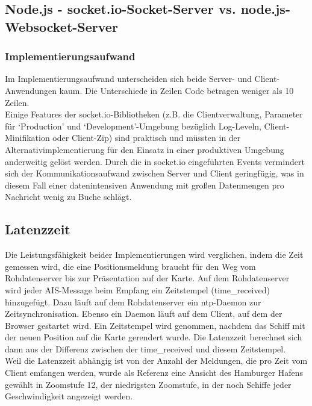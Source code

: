 \subsection{Node.js - socket.io-Socket-Server vs. node.js-Websocket-Server}\label{socket.io- vs html5-Server}
\subsubsection{Implementierungsaufwand}
Im Implementierungsaufwand unterscheiden sich beide Server- und Client-Anwendungen kaum. Die Unterschiede in Zeilen Code betragen weniger als 10 Zeilen.\\
Einige Features der socket.io-Bibliotheken (z.B. die Clientverwaltung, Parameter für ‘Production’ und ‘Development’-Umgebung bezüglich Log-Leveln, Client-Minifikation oder Client-Zip) sind praktisch und müssten in der Alternativimplementierung für den Einsatz in einer produktiven Umgebung anderweitig gelöst werden. Durch die in socket.io eingeführten Events vermindert sich der Kommunikationsaufwand zwischen Server und Client geringfügig, was in diesem Fall einer datenintensiven Anwendung mit großen Datenmengen pro Nachricht wenig zu Buche schlägt.
\subsection{Latenzzeit}
Die Leistungsfähigkeit beider Implementierungen wird verglichen, indem die Zeit gemessen wird, die eine Positionsmeldung braucht für den Weg vom Rohdatenserver bis zur Präsentation auf der Karte.
Auf dem Rohdatenserver wird jeder AIS-Message beim Empfang ein Zeitstempel (time\_received) hinzugefügt. Dazu läuft auf dem Rohdatenserver ein ntp-Daemon zur Zeitsynchronisation. Ebenso ein Daemon läuft auf dem Client, auf dem der Browser gestartet wird. Ein Zeitstempel wird genommen, nachdem das Schiff mit der neuen Position auf die Karte gerendert wurde. Die Latenzzeit berechnet sich dann aus der Differenz zwischen der time\_received und diesem Zeitstempel. \\
Weil die Latenzzeit abhängig ist von der Anzahl der Meldungen, die pro Zeit vom Client emfangen werden, wurde als Referenz eine Ansicht des Hamburger Hafens gewählt in Zoomstufe 12, der niedrigsten Zoomstufe, in der noch Schiffe jeder Geschwindigkeit angezeigt werden.
 
